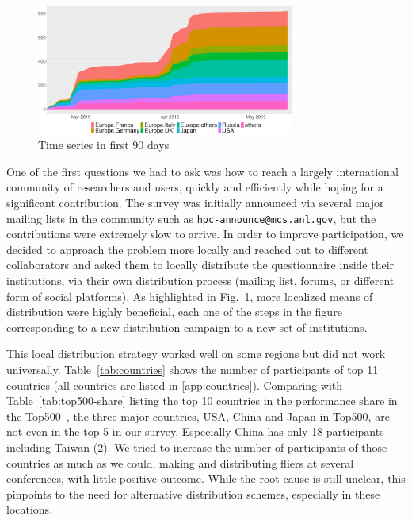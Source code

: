 \documentclass[preprint,5p,times]{elsarticle}
\begin{document}
\begin{figure}[htb]
  \begin{center}
    \includegraphics[width=8.5cm]{R-scripts/TimeSeries.pdf}
    \caption{Time series in first 90 days}
    \label{fig:time-series}
  \end{center}
\end{figure}

One of the first questions we had to ask was how to reach a largely
international community of researchers and users, quickly and
efficiently while hoping for a significant contribution. 
%
The survey was initially announced via several major mailing lists in the
community such as {\tt hpc-announce@mcs.anl.gov}, but the contributions were
extremely slow to arrive. In order to improve participation, we decided to
approach the problem more locally and reached out to different collaborators and
asked them to locally distribute the questionnaire inside their institutions,
via their own distribution process (mailing list, forums, or different form of
social platforms). As highlighted in Fig.~\ref{fig:time-series}, more localized
means of distribution were highly beneficial, each one of the steps in the
figure corresponding to a new distribution campaign to a new set of
institutions.


This local distribution strategy worked well on some regions but
did not work universally. Table~\ref{tab:countries} shows the number
of participants of top 11 countries (all countries are listed in
\ref{app:countries}).
Comparing with Table~\ref{tab:top500-share} listing the top 10
countries in the performance share in the Top500~\cite{Top500}, the
three major countries, USA, China and Japan in Top500, are not even in
the top 5 in our survey. Especially China has only 18 participants
including
Taiwan (2). We tried to increase the number of participants of those
countries as much as we could, making and distributing fliers at
several conferences, with little positive outcome. While the root cause is still unclear, this pinpoints to the need for alternative distribution schemes, especially in these locations.
\end{document}
